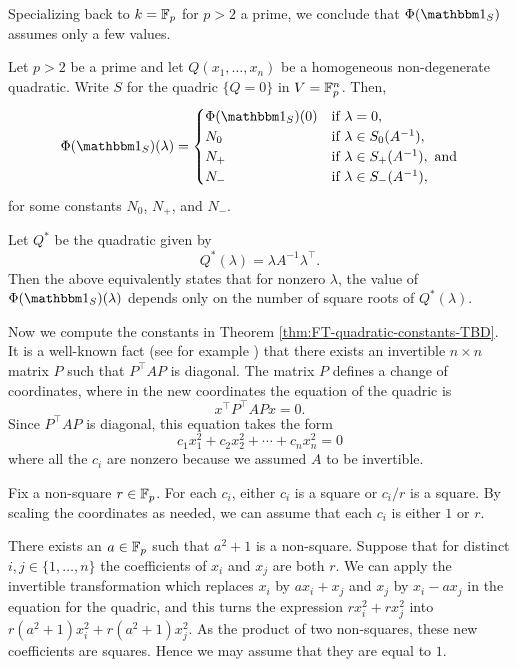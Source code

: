 Specializing back to $k=\mathbb{F}_p$ for $p>2$ a prime, we conclude that $\Phi(\IND_S)$ assumes only a few values.

\begin{thm}\label{thm:FT-quadratic-constants-TBD}
	Let $p > 2$ be a prime and let $Q(x_1,\ldots,x_n)$ be a homogeneous non-degenerate quadratic. Write $S$ for the quadric $\{Q = 0\}$ in $V=\mathbb{F}_p^n$. Then,
	\begin{equation}
	\Phi(\IND_S)(\lambda) = \begin{cases}
	\Phi(\IND_S)(0) & \text{if } \lambda = 0,\\
	N_0 & \text{if } \lambda \in S_0(A^{-1}),\\
	N_+ & \text{if } \lambda \in S_+(A^{-1}), \text{ and}\\
	N_- & \text{if } \lambda \in S_-(A^{-1}),
	\end{cases}
	\end{equation}
	for some constants $N_0$, $N_+$, and $N_-$.
\end{thm}
Let $Q^*$ be the quadratic given by
\[
	Q^*(\lambda) = \lambda A^{-1} \lambda^\top.
\]
Then the above equivalently states that for nonzero $\lambda$, the value of $\Phi(\IND_S)(\lambda)$ depends only on the number of square roots of $Q^*(\lambda)$.

Now we compute the constants in Theorem \ref{thm:FT-quadratic-constants-TBD}. It is a well-known fact (see for example \cite[Prop.~42:1]{omeara}) that there exists an invertible $n\times n$ matrix $P$ such that $P^\top A P$ is diagonal. The matrix $P$ defines a change of coordinates, where in the new coordinates the equation of the quadric is
\[
x^\top P^\top A P x = 0.
\]
Since $P^\top A P$ is diagonal, this equation takes the form
\[
c_1 x_1^2 + c_2 x_2^2 + \cdots + c_n x_n^2 = 0
\]
where all the $c_i$ are nonzero because we assumed $A$ to be invertible.

Fix a non-square $r\in \mathbb{F}_p$. For each $c_i$, either $c_i$ is a square or $c_i / r$ is a square. By scaling the coordinates as needed, we can assume that each $c_i$ is either $1$ or $r$.

There exists an $a\in\mathbb{F}_p$ such that $a^2 + 1$ is a non-square. Suppose that for distinct $i,j\in\{1,\ldots,n\}$ the coefficients of $x_i$ and $x_j$ are both $r$. We can apply the invertible transformation which replaces $x_i$ by $ax_i + x_j$ and $x_j$ by $x_i - ax_j$ in the equation for the quadric, and this turns the expression $rx_i^2 + rx_j^2$ into $r(a^2 + 1)x_i^2 + r(a^2+1)x_j^2$. As the product of two non-squares, these new coefficients are squares. Hence we may assume that they are equal to $1$.

